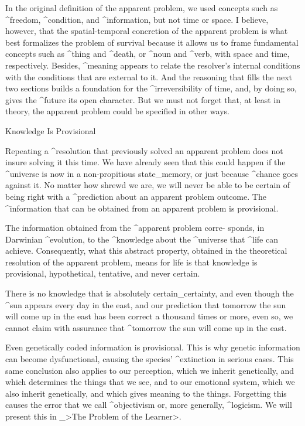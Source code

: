 In the original definition of the apparent problem, we used concepts
such as ^{freedom}, ^{condition}, and ^{information}, but not time or
space. I believe, however, that the spatial-temporal concretion of the
apparent problem is what best formalizes the problem of survival because
it allows us to frame fundamental concepts such as ^{thing} and
^{death}, or ^{noun} and ^{verb}, with space and time, respectively.
Besides, ^{meaning} appears to relate the resolver's internal conditions
with the conditions that are external to it. And the reasoning that
fills the next two sections builds a foundation for the
^{irreversibility} of time, and, by doing so, gives the ^{future} its
open character. But we must not forget that, at least in theory, the
apparent problem could be specified in other ways.


\Section Knowledge Is Provisional

Repeating a ^{resolution} that previously solved an apparent problem
does not insure solving it this time. We have already seen that this
could happen if the ^{universe} is now in a non-propitious
state_{memory}, or just because ^{chance} goes against it. No matter how
shrewd we are, we will never be able to be certain of being right with a
^{prediction} about an apparent problem outcome. The ^{information} that
can be obtained from an apparent problem is provisional.

The information obtained from the ^{apparent problem} corre-\break
sponds, in Darwinian ^{evolution}, to the ^{knowledge} about the
^{universe} that ^{life} can achieve. Consequently, what this abstract
property, obtained in the theoretical resolution of the apparent
problem, means for life is that knowledge is provisional, hypothetical,
tentative, and never certain.

There is no knowledge that is absolutely certain_{certainty}, and even
though the ^{sun} appears every day in the east, and our prediction that
tomorrow the sun will come up in the east has been correct a thousand
times or more, even so, we cannot claim with assurance that ^{tomorrow}
the sun will come up in the east.

Even genetically coded information is provisional. This is why genetic
information can become dysfunctional, causing the species' ^{extinction}
in serious cases. This same conclusion also applies to our perception,
which we inherit genetically, and which determines the things that we
see, and to our emotional system, which we also inherit genetically, and
which gives meaning to the things. Forgetting this causes the error that
we call ^{objectivism} or, more generally, ^{logicism}. We will present
this in _>The Problem of the Learner>.


